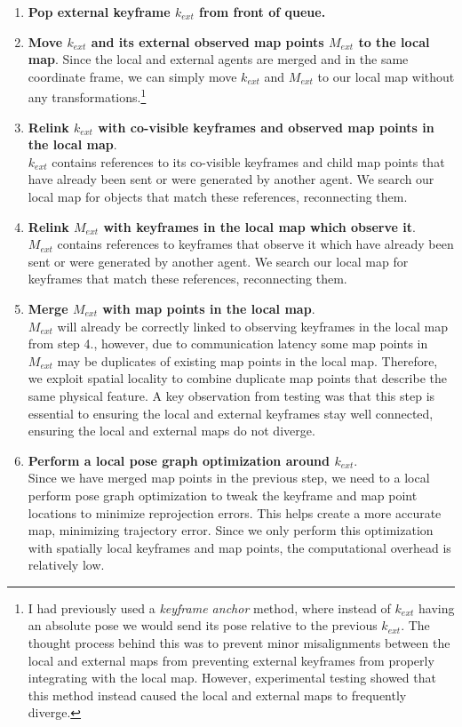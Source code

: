 \begin{enumerate}
    \item \textbf{Pop external keyframe $k_{ext}$ from front of queue.}
    \item \textbf{Move $k_{ext}$ and its external observed map points $M_{ext}$ to the local map}.
          Since the local and external agents are merged and in the same coordinate frame, we can simply move $k_{ext}$ and $M_{ext}$ to our local map without any transformations.\footnote[1]{I had previously used a \textit{keyframe anchor} method, where instead of $k_{ext}$ having an absolute pose we would send its pose relative to the previous $k_{ext}$. The thought process behind this was to prevent minor misalignments between the local and external maps from preventing external keyframes from properly integrating with the local map. However, experimental testing showed that this method instead caused the local and external maps to frequently diverge.}
    \item \textbf{Relink $k_{ext}$ with co-visible keyframes and observed map points in the local map}. \\
          $k_{ext}$ contains references to its co-visible keyframes and child map points that have already been sent or were generated by another agent. We search our local map for objects that match these references, reconnecting them.
    \item \textbf{Relink $M_{ext}$ with keyframes in the local map which observe it}. \\
          $M_{ext}$ contains references to keyframes that observe it which have already been sent or were generated by another agent. We search our local map for keyframes that match these references, reconnecting them.
    \item \textbf{Merge $M_{ext}$ with map points in the local map}. \\
          $M_{ext}$ will already be correctly linked to observing keyframes in the local map from step 4., however, due to communication latency some map points in $M_{ext}$ may be duplicates of existing map points in the local map. Therefore, we exploit spatial locality to combine duplicate map points that describe the same physical feature. A key observation from testing was that this step is essential to ensuring the local and external keyframes stay well connected, ensuring the local and external maps do not diverge.
    \item \textbf{Perform a local pose graph optimization around $k_{ext}$}. \\
          Since we have merged map points in the previous step, we need to a local perform pose graph optimization to tweak the keyframe and map point locations to minimize reprojection errors. This helps create a more accurate map, minimizing trajectory error. Since we only perform this optimization with spatially local keyframes and map points, the computational overhead is relatively low.
\end{enumerate}


